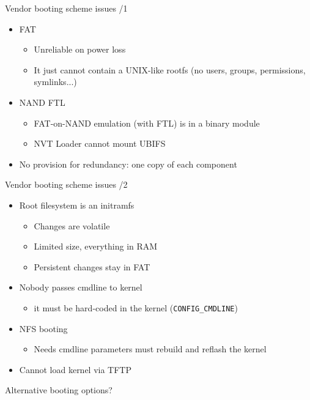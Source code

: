 \documentclass[xetex,table]{beamer}
\begin{document}
\begin{frame}{Vendor booting scheme issues /1}
  \begin{itemize}
  \item FAT
    \begin{itemize}
    \item Unreliable on power loss
    \item It just cannot contain a UNIX-like rootfs (no users, groups,
      permissions, symlinks...)
    \end{itemize}
  \item NAND FTL
    \begin{itemize}
    \item FAT-on-NAND emulation (with FTL) is in a binary module
    \item NVT Loader cannot mount UBIFS
  \end{itemize}
  \item No provision for redundancy: one copy of each component
  \end{itemize}
\end{frame}

\begin{frame}{Vendor booting scheme issues /2}
  \begin{itemize}
  \item Root filesystem is an initramfs
    \begin{itemize}
    \item Changes are volatile
    \item Limited size, everything in RAM
    \item Persistent changes stay in FAT
    \end{itemize}
  \item Nobody passes cmdline to kernel
    \begin{itemize}
    \item it must be hard-coded in the kernel (\texttt{CONFIG\_CMDLINE})
    \end{itemize}
  \item NFS booting
    \begin{itemize}
    \item Needs cmdline parameters \textrightarrow{} must rebuild and
      reflash the kernel
    \end{itemize}
  \item Cannot load kernel via TFTP
  \end{itemize}
\end{frame}

\begin{frame}
  \begin{center}
    Alternative booting options?
  \end{center}
\end{frame}
\end{document}

